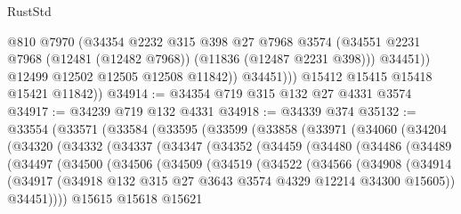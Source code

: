 \begin{lexlean}{RustStd}
\begin{coremodule}
                    @810
                    @7970
                    (@34354
                      @2232
                      @315
                      @398
                      @27
                      @7968
                      @3574
                      (@34551 @2231 @7968 (@12481 (@12482 @7968)) (@11836 (@12487 @2231 @398)))
                      @34451))
                  @12499
                  @12502
                  @12505
                  @12508
                  @11842))
              @34451)))
        @15412
        @15415
        @15418
        @15421
        @11842))
@34914 := @34354 @719 @315 @132 @27 @4331 @3574
@34917 := @34239 @719 @132 @4331
@34918 := @34339 @374
@35132 := @33554
    (@33571
      (@33584
        (@33595
          (@33599
            (@33858
              (@33971
                (@34060
                  (@34204
                    (@34320
                      (@34332
                        (@34337
                          (@34347
                            (@34352
                              (@34459
                                (@34480
                                  (@34486
                                    (@34489
                                      (@34497
                                        (@34500
                                          (@34506
                                            (@34509
                                              (@34519
                                                (@34522
                                                  (@34566
                                                    (@34908
                                                      (@34914
                                                        (@34917
                                                          (@34918
                                                            @132
                                                            @315
                                                            @27
                                                            @3643
                                                            @3574
                                                            @4329
                                                            @12214
                                                            @34300
                                                            @15605))
                                                        @34451))))
                                                @15615
                                                @15618
                                                @15621

\end{coremodule}
\end{lexlean}
